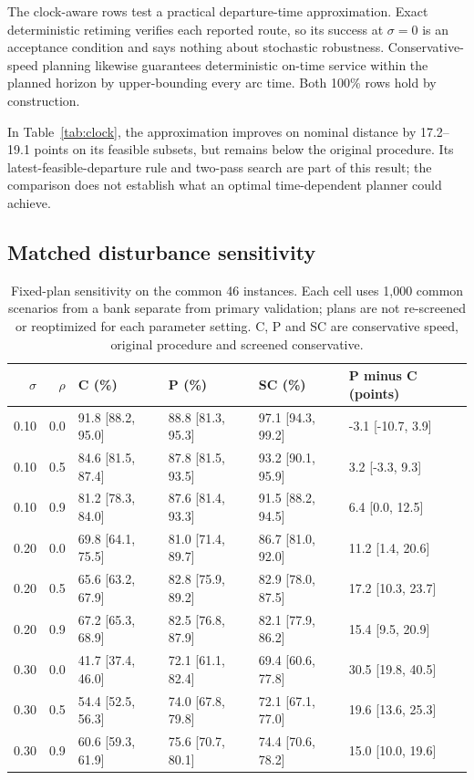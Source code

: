 The clock-aware rows test a practical departure-time approximation. Exact deterministic retiming verifies each reported route, so its success at $\sigma=0$ is an acceptance condition and says nothing about stochastic robustness. Conservative-speed planning likewise guarantees deterministic on-time service within the planned horizon by upper-bounding every arc time. Both 100\% rows hold by construction.

In Table~\ref{tab:clock}, the approximation improves on nominal distance by 17.2--19.1 points on its feasible subsets, but remains below the original procedure. Its latest-feasible-departure rule and two-pass search are part of this result; the comparison does not establish what an optimal time-dependent planner could achieve.

\subsection{Matched disturbance sensitivity}

\begin{table}[htbp]
\centering
\scriptsize
\caption{Fixed-plan sensitivity on the common 46 instances. Each cell uses 1,000 common scenarios from a bank separate from primary validation; plans are not re-screened or reoptimized for each parameter setting. C, P and SC are conservative speed, original procedure and screened conservative.}
\label{tab:sensitivity}
\begin{tabular}{rrllll}
\toprule
$\sigma$ & $\rho$ & C (\%) & P (\%) & SC (\%) & P minus C (points)\\
\midrule
0.10 & 0.0 & 91.8 [88.2, 95.0] & 88.8 [81.3, 95.3] & 97.1 [94.3, 99.2] & -3.1 [-10.7, 3.9]\\
0.10 & 0.5 & 84.6 [81.5, 87.4] & 87.8 [81.5, 93.5] & 93.2 [90.1, 95.9] & 3.2 [-3.3, 9.3]\\
0.10 & 0.9 & 81.2 [78.3, 84.0] & 87.6 [81.4, 93.3] & 91.5 [88.2, 94.5] & 6.4 [0.0, 12.5]\\
0.20 & 0.0 & 69.8 [64.1, 75.5] & 81.0 [71.4, 89.7] & 86.7 [81.0, 92.0] & 11.2 [1.4, 20.6]\\
0.20 & 0.5 & 65.6 [63.2, 67.9] & 82.8 [75.9, 89.2] & 82.9 [78.0, 87.5] & 17.2 [10.3, 23.7]\\
0.20 & 0.9 & 67.2 [65.3, 68.9] & 82.5 [76.8, 87.9] & 82.1 [77.9, 86.2] & 15.4 [9.5, 20.9]\\
0.30 & 0.0 & 41.7 [37.4, 46.0] & 72.1 [61.1, 82.4] & 69.4 [60.6, 77.8] & 30.5 [19.8, 40.5]\\
0.30 & 0.5 & 54.4 [52.5, 56.3] & 74.0 [67.8, 79.8] & 72.1 [67.1, 77.0] & 19.6 [13.6, 25.3]\\
0.30 & 0.9 & 60.6 [59.3, 61.9] & 75.6 [70.7, 80.1] & 74.4 [70.6, 78.2] & 15.0 [10.0, 19.6]\\
\bottomrule
\end{tabular}
\end{table}


